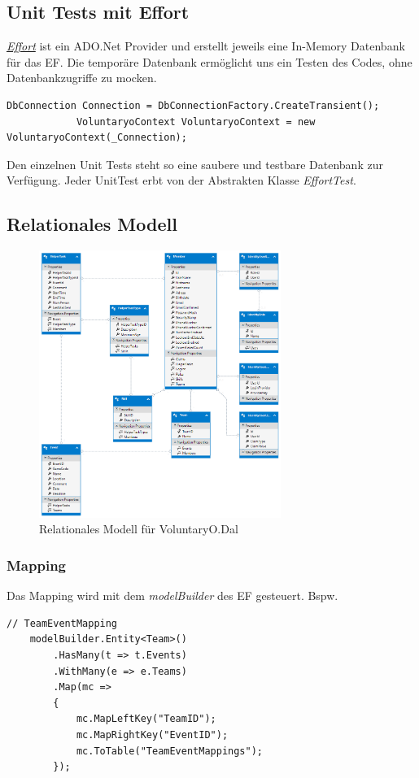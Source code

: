 	\subsection{Unit Tests mit Effort}
		\href{https://effort.codeplex.com/}{\textit{Effort}} ist ein ADO.Net Provider und erstellt jeweils eine In-Memory Datenbank für das EF. Die temporäre Datenbank ermöglicht uns ein Testen des Codes, ohne Datenbankzugriffe zu mocken.
		\begin{lstlisting}[language=CSharp, caption=Verwendung Effort für Unit Tests in EffortTest.cs, label=lst:effortunittest, firstnumber=1]
			DbConnection Connection = DbConnectionFactory.CreateTransient();
			VoluntaryoContext VoluntaryoContext = new VoluntaryoContext(_Connection);
	    \end{lstlisting}
	    Den einzelnen Unit Tests steht so eine saubere und testbare Datenbank zur Verfügung. Jeder UnitTest erbt von der Abstrakten Klasse \textit{EffortTest}.

	\subsection{Relationales Modell}
	    \begin{figure}[h]
	  		\vspace{-5pt}
	    	\centering
	    	\includegraphics[width=0.7\textwidth]{content/architekturdokumentation/images/edmx.png}
	  		\vspace{-20pt}
	    	\caption{Relationales Modell für VoluntaryO.Dal}
		\end{figure}
		\subsubsection{Mapping}
			Das Mapping wird mit dem \textit{modelBuilder} des EF gesteuert. Bspw.
			\begin{lstlisting}[language=CSharp, caption=Mapping in VoluntaryoContext.cs, label=lst:mappingcontextcs, firstnumber=1]
	// TeamEventMapping
	modelBuilder.Entity<Team>()
	    .HasMany(t => t.Events)
	    .WithMany(e => e.Teams)
	    .Map(mc =>
	    {
	        mc.MapLeftKey("TeamID");
	        mc.MapRightKey("EventID");
	        mc.ToTable("TeamEventMappings");
	    });
		    \end{lstlisting}

